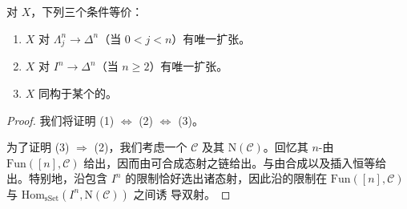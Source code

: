 \begin{theorem}\label{thm:spine-horn-nerve}
对\trSimplicialSet{} $X$，下列三个条件等价：
\begin{enumerate}[label=(\arabic*)]
  \item $X$ 对 $\Lambda^n_j \to \Delta^n$（当 $0 < j < n$）有唯一扩张。
  \item $X$ 对 $I^n \to \Delta^n$（当 $n \ge 2$）有唯一扩张。
  \item $X$ 同构于某个\trCategory{}的\trNerve{}。
\end{enumerate}
\end{theorem}

\begin{proof}
我们将证明 (1) $\Leftrightarrow$ (2) $\Leftrightarrow$ (3)。

为了证明 (3) $\Rightarrow$ (2)，我们考虑一个\trCategory{} $\mathcal{C}$ 及其%
\trNerve{} $\mathrm{N}(\mathcal{C})$。回忆其 $n$-\trSimplex{}由 $\mathrm{Fun}([n], \mathcal{C})$
给出，因而由可合成态射之链给出。\trFaceMap{}与\trDegeneracyMap{}由合成以及插入恒等给
出。特别地，沿\trSpine{}包含 $I^n$ 的限制恰好选出诸态射，因此沿\trSpine{}的限制在 $\mathrm{Fun}([n], \mathcal{C})$
与 $\mathrm{Hom}_{\mathrm{sSet}}(I^n, \mathrm{N}(\mathcal{C}))$ 之间诱
导双射。


\end{proof}
